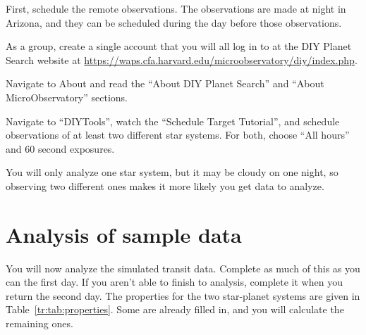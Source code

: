 First, schedule the remote observations. The observations are made at night in Arizona, and they can be scheduled during the day before those observations.

\begin{steps}

	\item As a group, create a single account that you will all log in to at the DIY Planet Search website at \url{https://waps.cfa.harvard.edu/microobservatory/diy/index.php}.
	
	\item Navigate to About and read the ``About DIY Planet Search'' and ``About MicroObservatory'' sections.
	
	
	\item Navigate to ``DIYTools'', watch the ``Schedule Target Tutorial'', and schedule observations of at least two different star systems. For both, choose ``All hours'' and 60 second exposures.
	
\end{steps}

You will only analyze one star system, but it may be cloudy on one night, so observing two different ones makes it more likely you get data to analyze.

\section{Analysis of sample data}

You will now analyze the simulated transit data. Complete as much of
this as you can the first day. If you aren’t able to finish to analysis,
complete it when you return the second day. The properties for the two star-planet systems are given in Table\ \ref{tr:tab:properties}. Some are already filled in, and you will calculate the remaining ones.

